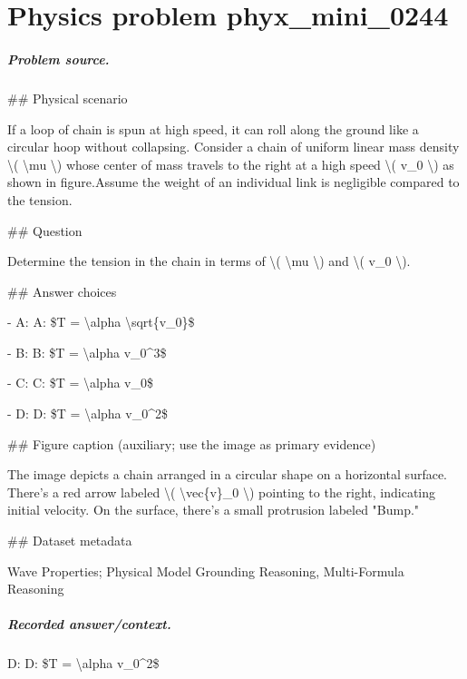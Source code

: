 
\chapter{Physics problem phyx\_mini\_0244}
\label{ch:PhyXMiniProblems_problem_phyx_mini_0244}

\paragraph{Problem source.}
\#\# Physical scenario

If a loop of chain is spun at high speed, it can roll along the ground like a circular hoop without collapsing. Consider a chain of uniform linear mass density \textbackslash{}( \textbackslash{}mu \textbackslash{}) whose center of mass travels to the right at a high speed \textbackslash{}( v\_0 \textbackslash{}) as shown in figure.Assume the weight of an individual link is negligible compared to the tension.

\#\# Question

Determine the tension in the chain in terms of \textbackslash{}( \textbackslash{}mu \textbackslash{}) and \textbackslash{}( v\_0 \textbackslash{}).

\#\# Answer choices

- A: A: \$T = \textbackslash{}alpha \textbackslash{}sqrt\{v\_0\}\$

- B: B: \$T = \textbackslash{}alpha v\_0\textasciicircum{}3\$

- C: C: \$T = \textbackslash{}alpha v\_0\$

- D: D: \$T = \textbackslash{}alpha v\_0\textasciicircum{}2\$

\#\# Figure caption (auxiliary; use the image as primary evidence)

The image depicts a chain arranged in a circular shape on a horizontal surface. There's a red arrow labeled \textbackslash{}( \textbackslash{}vec\{v\}\_0 \textbackslash{}) pointing to the right, indicating initial velocity. On the surface, there's a small protrusion labeled "Bump."

\#\# Dataset metadata

Wave Properties; Physical Model Grounding Reasoning, Multi-Formula Reasoning

\paragraph{Recorded answer/context.}
D: D: \$T = \textbackslash{}alpha v\_0\textasciicircum{}2\$

